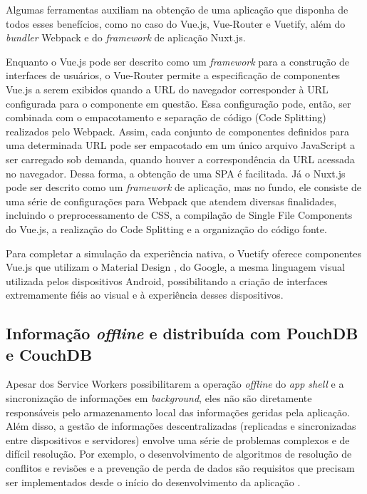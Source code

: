 \documentclass[
	article,			%
	12pt,				%
	oneside,			%
	a4paper,			%
	english,			%
	brazil,				%
	sumario=tradicional
	]{abntex2}
\begin{document}
Algumas ferramentas auxiliam na obtenção de uma aplicação que disponha de todos esses benefícios, como no caso do Vue.js, Vue-Router \cite{vuerouter-2017} e Vuetify, além do \textit{bundler} Webpack \cite{webpack-2017} e do \textit{framework} de aplicação Nuxt.js.

Enquanto o Vue.js pode ser descrito como um \textit{framework} para a construção de interfaces de usuários, o Vue-Router permite a especificação de componentes Vue.js a serem exibidos quando a URL do navegador corresponder à URL configurada para o componente em questão. Essa configuração pode, então, ser combinada com o empacotamento e separação de código (Code Splitting) realizados pelo Webpack. Assim, cada conjunto de componentes definidos para uma determinada URL pode ser empacotado em um único arquivo JavaScript a ser carregado sob demanda, quando houver a correspondência da URL acessada no navegador. Dessa forma, a obtenção de uma SPA é facilitada. Já o Nuxt.js pode ser descrito como um \textit{framework} de aplicação, mas no fundo, ele consiste de uma série de configurações para Webpack que atendem diversas finalidades, incluindo o preprocessamento de CSS, a compilação de Single File Components do Vue.js, a realização do Code Splitting e a organização do código fonte.

Para completar a simulação da experiência nativa, o Vuetify oferece componentes Vue.js que utilizam o Material Design \cite{material-design-2018}, do Google, a mesma linguagem visual utilizada pelos dispositivos Android, possibilitando a criação de interfaces extremamente fiéis ao visual e à experiência desses dispositivos.

\subsection{Informação \textit{offline} e distribuída com PouchDB e CouchDB}

Apesar dos Service Workers possibilitarem a operação \textit{offline} do \textit{app shell} e a sincronização de informações em \textit{background}, eles não são diretamente responsáveis pelo armazenamento local das informações geridas pela aplicação. Além disso, a gestão de informações descentralizadas (replicadas e sincronizadas entre dispositivos e servidores) envolve uma série de problemas complexos e de difícil resolução. Por exemplo, o desenvolvimento de algoritmos de resolução de conflitos e revisões e a prevenção de perda de dados são requisitos que precisam ser implementados desde o início do desenvolvimento da aplicação \cite{martynus-2017}.
\end{document}
